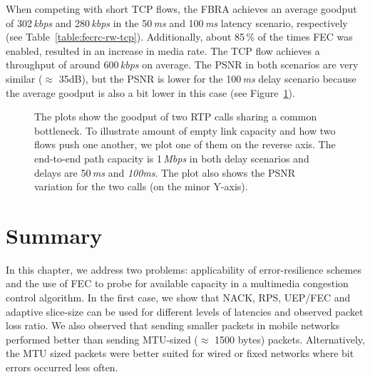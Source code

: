 When competing with short TCP flows, the FBRA achieves an average goodput of
302\,\emph{kbps} and 280\,\emph{kbps} in the 50\,\emph{ms} and 100\,\emph{ms}
latency scenario, respectively (see Table~\ref{table:fecrc-rw-tcp}).
Additionally, about 85\,\% of the times FEC was enabled, resulted in an
increase in media rate. The TCP flow achieves a throughput of around
600\,\emph{kbps} on average. The PSNR in both scenarios are very similar
($\approx$ 35dB), but the PSNR is lower for the 100\,\emph{ms} delay scenario because the
average goodput is also a bit lower in this case (see Figure~\ref{fig:fecrc-dnet}).


\begin{figure}[!t]
\caption{The plots show the goodput of two RTP calls sharing a common
bottleneck. To illustrate amount of empty link capacity and how two flows push
one another, we plot one of them on the reverse axis. The end-to-end path
capacity is 1\,\emph{Mbps} in both delay scenarios and delays are 50\,\emph{ms}
and \emph{100ms}. The plot also shows the PSNR variation for the two calls (on
the minor Y-axis).}
\label{fig:fecrc-dnet}
\end{figure}


\section{Summary}

In this chapter, we address two problems: applicability of error-resilience
schemes and the use of FEC to probe for available capacity in a multimedia congestion
control algorithm. In the first case, we show that NACK, RPS, UEP/FEC and adaptive
slice-size can be used for different levels of latencies and observed packet
loss ratio. We also observed that sending smaller packets in mobile networks
performed better than sending MTU-sized ($\approx$ 1500 bytes) packets.
Alternatively, the MTU sized packets were better suited for wired or fixed
networks where bit errors occurred less often.

